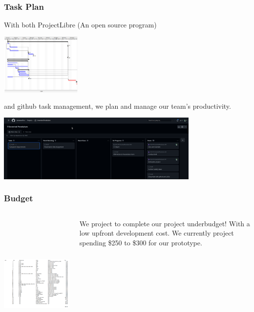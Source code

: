 \documentclass[aspectratio=169]{beamer}
\begin{document}
\begin{frame}
    \frametitle{Task Plan}

    With both ProjectLibre (An open source program)

    \includegraphics[height=3cm]{ProjectLibre}

    and github task management, we plan and manage our team's productivity.

    \includegraphics[width=10cm]{ProjectPlan}
\end{frame}

\begin{frame}
    \frametitle{Budget}

    \begin{columns}
        \begin{column}{0.70\textwidth}
            \includegraphics[height=7cm]{BOMTable}
        \end{column}

        \begin{column}{0.30\textwidth}
            We project to complete our project underbudget! With a low upfront development cost.
            We currently project spending \$250 to \$300 for our prototype.
        \end{column}
    \end{columns}
\end{frame}
\end{document}
